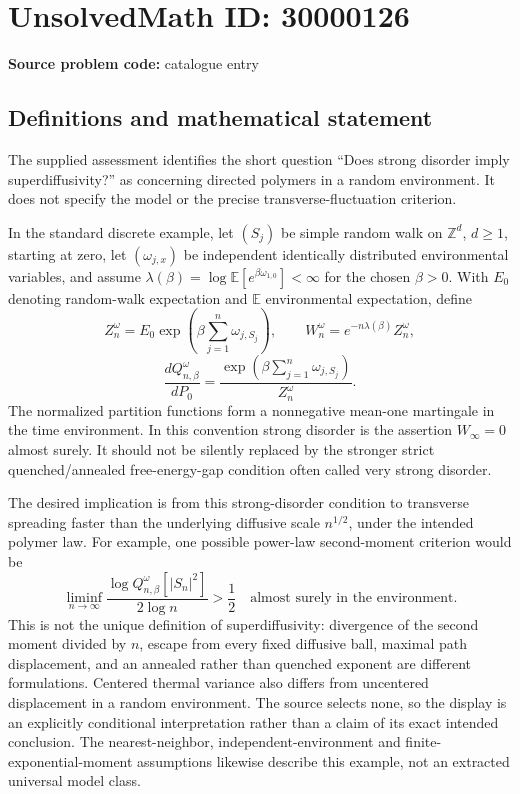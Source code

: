 \documentclass[11pt]{article}
\newcommand{\Z}{\mathbb{Z}}
\begin{document}
\section*{UnsolvedMath ID: 30000126}
\textbf{Source problem code:} catalogue entry
\subsection{Definitions and mathematical statement}
The supplied assessment identifies the short question ``Does strong disorder imply superdiffusivity?'' as concerning directed polymers in a random environment. It does not specify the model or the precise transverse-fluctuation criterion.

In the standard discrete example, let $(S_j)$ be simple random walk on $\Z^d$, $d\geq1$, starting at zero, let $(\omega_{j,x})$ be independent identically distributed environmental variables, and assume $\lambda(\beta)=\log\mathbb E[e^{\beta\omega_{1,0}}]<\infty$ for the chosen $\beta>0$. With $E_0$ denoting random-walk expectation and $\mathbb E$ environmental expectation, define
\[
 Z_n^\omega=E_0\exp\!\left(\beta\sum_{j=1}^n\omega_{j,S_j}\right),\qquad
 W_n^\omega=e^{-n\lambda(\beta)}Z_n^\omega,
\]
\[
 \frac{dQ_{n,\beta}^\omega}{dP_0}
 =\frac{\exp(\beta\sum_{j=1}^n\omega_{j,S_j})}{Z_n^\omega}.
\]
The normalized partition functions form a nonnegative mean-one martingale in the time environment. In this convention strong disorder is the assertion $W_\infty=0$ almost surely. It should not be silently replaced by the stronger strict quenched/annealed free-energy-gap condition often called very strong disorder.

The desired implication is from this strong-disorder condition to transverse spreading faster than the underlying diffusive scale $n^{1/2}$, under the intended polymer law. For example, one possible power-law second-moment criterion would be
\[
 \liminf_{n\to\infty}
 \frac{\log Q_{n,\beta}^\omega[|S_n|^2]}{2\log n}>\frac12
 \quad\text{almost surely in the environment}.
\]
This is not the unique definition of superdiffusivity: divergence of the second moment divided by $n$, escape from every fixed diffusive ball, maximal path displacement, and an annealed rather than quenched exponent are different formulations. Centered thermal variance also differs from uncentered displacement in a random environment. The source selects none, so the display is an explicitly conditional interpretation rather than a claim of its exact intended conclusion. The nearest-neighbor, independent-environment and finite-exponential-moment assumptions likewise describe this example, not an extracted universal model class.
\end{document}

